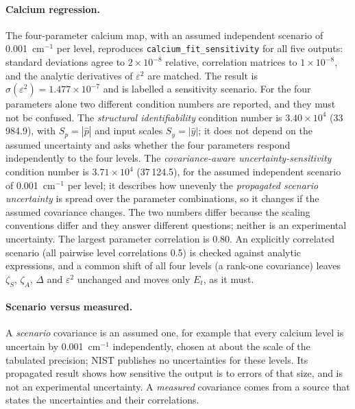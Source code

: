 \paragraph{Calcium regression.} The four-parameter calcium map, with an assumed independent scenario of 0.001~cm$^{-1}$ per level, reproduces \texttt{calcium\_fit\_sensitivity} for all five outputs: standard deviations agree to $2\times10^{-8}$ relative, correlation matrices to $1\times10^{-8}$, and the analytic derivatives of $\varepsilon^{2}$ are matched. The result is $\sigma(\varepsilon^2)=1.477\times10^{-7}$ and is labelled a sensitivity scenario. For the four parameters alone two different condition numbers are reported, and they must not be confused. The \emph{structural identifiability} condition number is $3.40\times10^{4}$ (33\,984.9), with $S_p=|\hat p|$ and input scales $S_y=|\hat y|$; it does not depend on the assumed uncertainty and asks whether the four parameters respond independently to the four levels. The \emph{covariance-aware uncertainty-sensitivity} condition number is $3.71\times10^{4}$ (37\,124.5), for the assumed independent scenario of 0.001~cm$^{-1}$ per level; it describes how unevenly the \emph{propagated scenario uncertainty} is spread over the parameter combinations, so it changes if the assumed covariance changes. The two numbers differ because the scaling conventions differ and they answer different questions; neither is an experimental uncertainty. The largest parameter correlation is 0.80. An explicitly correlated scenario (all pairwise level correlations 0.5) is checked against analytic expressions, and a common shift of all four levels (a rank-one covariance) leaves $\zeta_S$, $\zeta_A$, $\Delta$ and $\varepsilon^2$ unchanged and moves only $E_t$, as it must.

\paragraph{Scenario versus measured.} A \emph{scenario} covariance is an assumed one, for example that every calcium level is uncertain by 0.001~cm$^{-1}$ independently, chosen at about the scale of the tabulated precision; NIST publishes no uncertainties for these levels. Its propagated result shows how sensitive the output is to errors of that size, and is not an experimental uncertainty. A \emph{measured} covariance comes from a source that states the uncertainties and their correlations.

